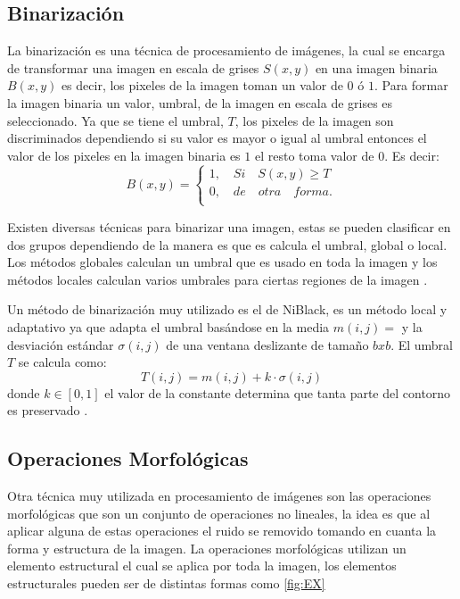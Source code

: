 \subsection{Binarización}\label{subsec:Binarization} 

La binarización es una técnica de procesamiento de imágenes, la cual se encarga de transformar una imagen en escala de grises $S(x,y)$ en una imagen binaria $B(x,y)$ es decir, los pixeles de la imagen toman un valor de $0$ ó $1$.   
Para formar la imagen binaria un valor, umbral, de la imagen en escala de grises es seleccionado. Ya que se tiene el umbral, $T$,     
los pixeles de la imagen son discriminados dependiendo si su valor es mayor o igual al umbral entonces el valor de los pixeles en la imagen binaria es $1$ el resto toma valor de $0$. Es decir: 
$$B(x,y)=
\begin{cases}   
1, \quad Si \quad S(x,y)\geq T \\
0, \quad de \quad otra \quad forma.\\
\end{cases}$$

Existen diversas técnicas para binarizar una imagen, estas se pueden clasificar en dos grupos dependiendo de la manera es que es calcula el umbral, global o local. Los métodos globales calculan un umbral que es usado en toda la imagen y los métodos locales calculan varios umbrales para ciertas regiones de la imagen \citep{Chaki2014}.  

Un método de binarización muy utilizado es el de NiBlack,\citep{Niblack1985} es un método local y adaptativo ya que adapta el umbral basándose en la media $m(i,j)=$ y la desviación estándar $\sigma(i,j)$ de una ventana deslizante de tamaño $bxb$. El umbral $T$  se calcula como: 
$$T(i,j)=m(i,j)+k \cdot \sigma(i,j)$$ 
donde $k \in [0,1]$ el valor de la constante determina que tanta parte del contorno es preservado \citep{Chaki2014}.


  
\subsection{Operaciones Morfológicas}\label{subsec:OperacionesMorfologicas} 

Otra técnica muy utilizada en procesamiento de imágenes son las operaciones morfológicas que son un conjunto de operaciones no lineales, la idea es que al aplicar alguna de estas operaciones el ruido se removido tomando en cuanta la forma y estructura de la imagen. 
La operaciones morfológicas utilizan un elemento estructural el cual se aplica por toda la imagen, los elementos estructurales pueden ser de distintas formas como \ref{fig:EX}

